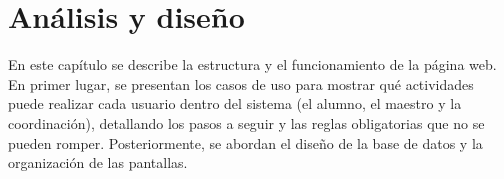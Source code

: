 \chapter{Análisis y diseño}
\label{cap:analisis_diseno}

En este capítulo se describe la estructura y el funcionamiento de la página web. En primer lugar, se presentan los casos de uso para mostrar qué actividades puede realizar cada usuario dentro del sistema (el alumno, el maestro y la coordinación), detallando los pasos a seguir y las reglas obligatorias que no se pueden romper. Posteriormente, se abordan el diseño de la base de datos y la organización de las pantallas.




